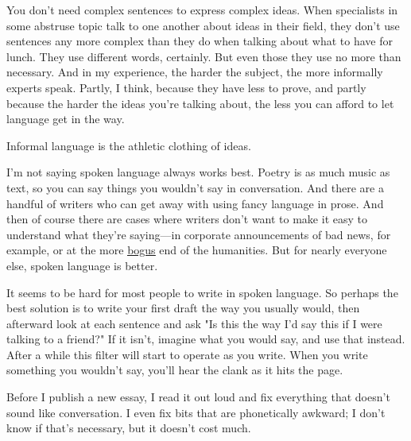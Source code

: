 You don't need complex
                  sentences to express complex ideas. When specialists in some
                  abstruse topic talk to one another about ideas in their field,
                  they don't use sentences any more complex than they do when
                  talking about what to have for lunch. They use different
                  words, certainly. But even those they use no more than
                  necessary. And in my experience, the harder the subject, the
                  more informally experts speak. Partly, I think, because they
                  have less to prove, and partly because the harder the ideas
                  you're talking about, the less you can afford to let language
                  get in the way.

Informal language is the athletic
                  clothing of ideas.

I'm not saying spoken language
                  always works best. Poetry is as much music as text, so you can
                  say things you wouldn't say in conversation. And there are a
                  handful of writers who can get away with using fancy language
                  in prose. And then of course there are cases where writers
                  don't want to make it easy to understand what they're
                  saying---in corporate announcements of bad news, for
                  example, or at the more
                  \href{https://scholar.google.com/scholar?hl=en\&as\_sdt=1,5\&q=transgression+narrative+postmodern+gender}{\underline{bogus}}
                  end of the humanities. But for nearly everyone else, spoken
                  language is better.

It seems to be hard for most
                  people to write in spoken language. So perhaps the best
                  solution is to write your first draft the way you usually
                  would, then afterward look at each sentence and ask "Is this
                  the way I'd say this if I were talking to a friend?" If it
                  isn't, imagine what you would say, and use that instead. After
                  a while this filter will start to operate as you write. When
                  you write something you wouldn't say, you'll hear the clank as
                  it hits the page.

Before I publish a new essay, I
                  read it out loud and fix everything that doesn't sound like
                  conversation. I even fix bits that are phonetically awkward; I
                  don't know if that's necessary, but it doesn't cost much.

